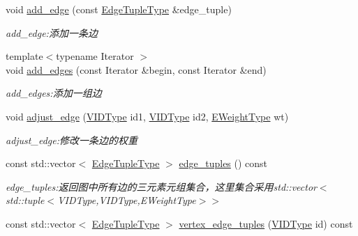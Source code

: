 \begin{DoxyCompactItemize}
void \hyperlink{struct_introduction_to_algorithm_1_1_graph_algorithm_1_1_graph_a3ddca71ba690d09471a7de78bcaa6fea}{add\+\_\+edge} (const \hyperlink{struct_introduction_to_algorithm_1_1_graph_algorithm_1_1_graph_ad1eb485d135eb8076a44b00904ae2f5a}{Edge\+Tuple\+Type} \&edge\+\_\+tuple)
\begin{DoxyCompactList}\small\item\em add\+\_\+edge\+:添加一条边 \end{DoxyCompactList}\item 
{\footnotesize template$<$typename Iterator $>$ }\\void \hyperlink{struct_introduction_to_algorithm_1_1_graph_algorithm_1_1_graph_abda82467495ef0109b14061a6bbe84b9}{add\+\_\+edges} (const Iterator \&begin, const Iterator \&end)
\begin{DoxyCompactList}\small\item\em add\+\_\+edges\+:添加一组边 \end{DoxyCompactList}\item 
void \hyperlink{struct_introduction_to_algorithm_1_1_graph_algorithm_1_1_graph_abfbc7f8a38017fd1422b5c6f1e8b6594}{adjust\+\_\+edge} (\hyperlink{struct_introduction_to_algorithm_1_1_graph_algorithm_1_1_graph_a507632614d13e91d29acbf8acb0b0f0f}{V\+I\+D\+Type} id1, \hyperlink{struct_introduction_to_algorithm_1_1_graph_algorithm_1_1_graph_a507632614d13e91d29acbf8acb0b0f0f}{V\+I\+D\+Type} id2, \hyperlink{struct_introduction_to_algorithm_1_1_graph_algorithm_1_1_graph_a77f6d3ef31203e0d6ebd2ed87928978a}{E\+Weight\+Type} wt)
\begin{DoxyCompactList}\small\item\em adjust\+\_\+edge\+:修改一条边的权重 \end{DoxyCompactList}\item 
const std\+::vector$<$ \hyperlink{struct_introduction_to_algorithm_1_1_graph_algorithm_1_1_graph_ad1eb485d135eb8076a44b00904ae2f5a}{Edge\+Tuple\+Type} $>$ \hyperlink{struct_introduction_to_algorithm_1_1_graph_algorithm_1_1_graph_a0cadf10557297a2cb10aec457eb70b3f}{edge\+\_\+tuples} () const 
\begin{DoxyCompactList}\small\item\em edge\+\_\+tuples\+:返回图中所有边的三元素元组集合，这里集合采用{\ttfamily std\+::vector$<$std\+::tuple$<$V\+I\+D\+Type,V\+I\+D\+Type,E\+Weight\+Type$>$$>$} \end{DoxyCompactList}\item 
const std\+::vector$<$ \hyperlink{struct_introduction_to_algorithm_1_1_graph_algorithm_1_1_graph_ad1eb485d135eb8076a44b00904ae2f5a}{Edge\+Tuple\+Type} $>$ \hyperlink{struct_introduction_to_algorithm_1_1_graph_algorithm_1_1_graph_a1a36b41adf54b242ff40610eae219eda}{vertex\+\_\+edge\+\_\+tuples} (\hyperlink{struct_introduction_to_algorithm_1_1_graph_algorithm_1_1_graph_a507632614d13e91d29acbf8acb0b0f0f}{V\+I\+D\+Type} id) const 

\end{DoxyCompactItemize}
